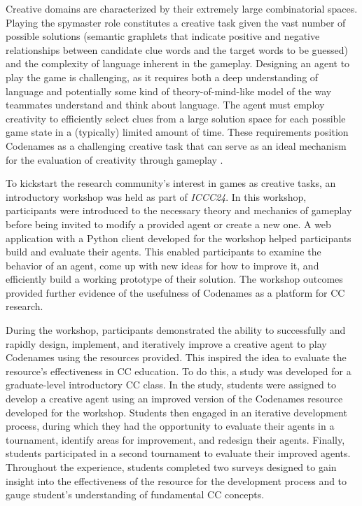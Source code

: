 \documentclass[phd,electronic,oneside,twosidetoc,letterpaper,chaptercenter,parttop,lof]{byumsphd}
\begin{document}
Creative domains are characterized by their extremely large combinatorial spaces. Playing the spymaster role constitutes a creative task given the vast number of possible solutions (semantic graphlets that indicate positive and negative relationships between candidate clue words and the target words to be guessed) and the complexity of language inherent in the gameplay. Designing an agent to play the game is challenging, as it requires both a deep understanding of language and potentially some kind of theory-of-mind-like model of the way teammates understand and think about language.  The agent must employ creativity to efficiently select clues from a large solution space for each possible game state in a (typically) limited amount of time. These requirements position Codenames as a challenging creative task that can serve as an ideal mechanism for the evaluation of creativity through gameplay \cite{spendlove2023}.

To kickstart the research community's interest in games as creative tasks, an introductory workshop was held as part of \emph{ICCC24}. In this workshop, participants were introduced to the necessary theory and mechanics of gameplay before being invited to modify a provided agent or create a new one. A web application with a Python client developed for the workshop helped participants build and evaluate their agents. This enabled participants to examine the behavior of an agent, come up with new ideas for how to improve it, and efficiently build a working prototype of their solution. The workshop outcomes provided further evidence of the usefulness of Codenames as a platform for CC research.

During the workshop, participants demonstrated the ability to successfully and rapidly design, implement, and iteratively improve a creative agent to play Codenames using the resources provided. This inspired the idea to evaluate the resource's effectiveness in CC education. To do this, a study was developed for a graduate-level introductory CC class. In the study, students were assigned to develop a creative agent using an improved version of the Codenames resource developed for the workshop. Students then engaged in an iterative development process, during which they had the opportunity to evaluate their agents in a tournament, identify areas for improvement, and redesign their agents. Finally, students participated in a second tournament to evaluate their improved agents. Throughout the experience, students completed two surveys designed to gain insight into the effectiveness of the resource for the development process and to gauge student's understanding of fundamental CC concepts. 
    
\end{document}
